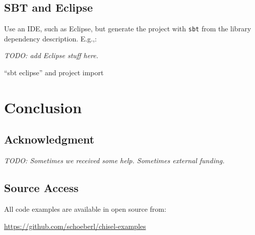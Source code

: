 \documentclass[a4paper]{article}
\newcommand{\code}[1]{{\small{\texttt{#1}}}}
\newcommand{\todo}[1]{{\emph{TODO: #1}}}
\begin{document}
\subsection{SBT and Eclipse}

Use an IDE, such as Eclipse, but generate the project with \code{sbt}
from the library dependency description. E.g.,:

\todo{add Eclipse stuff here.}

``sbt eclipse'' and project import

\section{Conclusion}
\label{sec:conclusion}


\subsection*{Acknowledgment}

\todo{Sometimes we received some help. Sometimes external funding.}



\subsection*{Source Access}

All code examples are available in open source from:

\url{https://github.com/schoeberl/chisel-examples}



\end{document}
